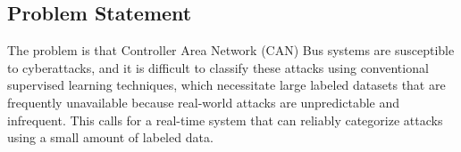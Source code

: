 \subsection{Problem Statement}
\label{subcsec:problem}

The problem is that Controller Area Network (CAN) Bus systems are susceptible to cyberattacks, and it is difficult to classify these attacks using conventional supervised learning techniques, which necessitate large labeled datasets that are frequently unavailable because real-world attacks are unpredictable and infrequent. This calls for a real-time system that can reliably categorize attacks using a small amount of labeled data.